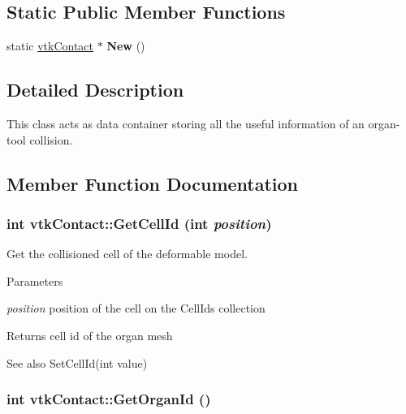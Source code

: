 \subsection*{Static Public Member Functions}
\begin{DoxyCompactItemize}
\item 
\hypertarget{classvtkContact_aa745684ad927626b1b16126fb339a799}{
static \hyperlink{classvtkContact}{vtkContact} $\ast$ {\bfseries New} ()}
\label{classvtkContact_aa745684ad927626b1b16126fb339a799}

\end{DoxyCompactItemize}


\subsection{Detailed Description}
This class acts as data container storing all the useful information of an organ-\/tool collision. 

\subsection{Member Function Documentation}
\hypertarget{classvtkContact_a825566e780e4fca5dc766b3c7c259366}{
\subsubsection[{GetCellId}]{\setlength{\rightskip}{0pt plus 5cm}int vtkContact::GetCellId (int {\em position})}}
\label{classvtkContact_a825566e780e4fca5dc766b3c7c259366}


Get the collisioned cell of the deformable model. 
\begin{DoxyParams}{Parameters}
\item[{\em position}]position of the cell on the CellIds collection \end{DoxyParams}
\begin{DoxyReturn}{Returns}
cell id of the organ mesh 
\end{DoxyReturn}
\begin{DoxySeeAlso}{See also}
SetCellId(int value) 
\end{DoxySeeAlso}
\hypertarget{classvtkContact_a44064eb7f79795b0c685deb2ecca7ecc}{
\subsubsection[{GetOrganId}]{\setlength{\rightskip}{0pt plus 5cm}int vtkContact::GetOrganId ()}}
\label{classvtkContact_a44064eb7f79795b0c685deb2ecca7ecc}


